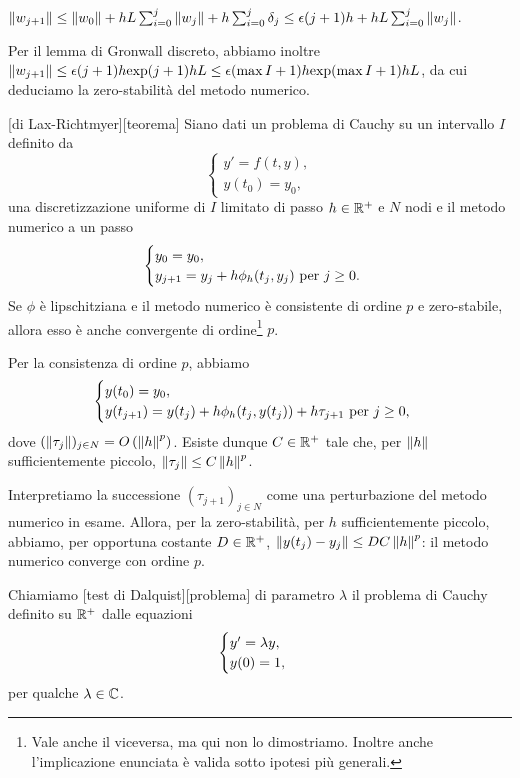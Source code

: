 $\Norm{w_{j + 1}} \leq \Norm{w_0} + \Step L \sum_{i = 0}^j \Norm{w_j} + \Step \sum_{i = 0}^j \Perturbation_j \leq \epsilon(j + 1)\Step + \Step L \sum_{i = 0}^j \Norm{w_j}$.
\par Per il lemma di Gronwall discreto, abbiamo inoltre $\Norm{w_{j + 1}} \leq \epsilon(j + 1)\Step \Exponential{(j + 1)\Step L} \leq \epsilon(\max{I} + 1) \Step \Exponential{(\max{I} + 1)\Step L}$, da cui deduciamo la zero-stabilit\`a del metodo numerico. \EndProof
\begin{Theorem}
	[di Lax-Richtmyer][teorema]
	Siano dati un problema di Cauchy su un intervallo $I$ definito da
	\[
	\begin{cases}
		y' = f(t,y),\\
		y(t_0) = y_0,
	\end{cases}
	\]
	una discretizzazione uniforme di $I$ limitato di passo $h \in \mathbb{R}^+$ e $N$ nodi e il metodo numerico a un passo
	\[
	\begin{cases}
		y_0 = y_0,\\
		y_{j + 1} = y_j + h\phi_h(t_j,y_j)\text{ per }j \geq 0.
	\end{cases}
	\]
	Se $\phi$ \`e lipschitziana e il metodo numerico \`e consistente di ordine $p$ e zero-stabile, allora esso \`e anche convergente di ordine\footnote{Vale anche il viceversa, ma qui non lo dimostriamo. Inoltre anche l'implicazione enunciata \`e valida sotto ipotesi pi\`u generali.} $p$.
\end{Theorem}
\Proof Per la consistenza di ordine $p$, abbiamo
\[
\begin{cases}
	y(t_0) = y_0,\\
	y(t_{j + 1}) = y(t_j) + h\phi_h(t_j,y(t_j)) + h\tau_{j + 1}\text{ per }j \geq 0,
\end{cases}
\]
dove $\IsBigO{(\Norm{\LocalTruncationError_j})_{j \in N}}{\Norm{h}^p}$. Esiste dunque $C \in \mathbb{R}^+$ tale che, per $\Norm{h}$ sufficientemente piccolo, $\Norm{\LocalTruncationError_j} \leq C \Norm{h}^p$.
\par Interpretiamo la successione $(\tau_{j + 1})_{j \in N}$ come una perturbazione del metodo numerico in esame. Allora, per la zero-stabilit\`a, per $h$ sufficientemente piccolo, abbiamo, per opportuna costante $D \in \mathbb{R}^+$, $\Norm{y(t_j) - y_j} \leq D C \Norm{h}^p$: il metodo numerico converge con ordine $p$. \EndProof
\begin{Definition}
	Chiamiamo [test di Dalquist][problema] di parametro $\lambda$ il problema di Cauchy definito su $\mathbb{R}^+$ dalle equazioni
	\[
	\begin{cases}
		y' = \lambda y,\\
		y(0) = 1,
	\end{cases}
	\]
	per qualche $\lambda \in \mathbb{C}$.
\end{Definition}
